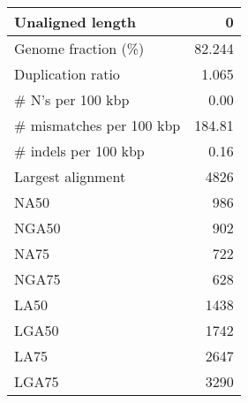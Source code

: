 \documentclass[12pt,a4paper]{article}
\begin{document}
\begin{table}[ht]
\begin{center}
\begin{tabular}{|l*{1}{|r}|}
Unaligned length & 0 \\ \hline
Genome fraction (\%) & 82.244 \\ \hline
Duplication ratio & 1.065 \\ \hline
\# N's per 100 kbp & 0.00 \\ \hline
\# mismatches per 100 kbp & 184.81 \\ \hline
\# indels per 100 kbp & 0.16 \\ \hline
Largest alignment & 4826 \\ \hline
NA50 & 986 \\ \hline
NGA50 & 902 \\ \hline
NA75 & 722 \\ \hline
NGA75 & 628 \\ \hline
LA50 & 1438 \\ \hline
LGA50 & 1742 \\ \hline
LA75 & 2647 \\ \hline
LGA75 & 3290 \\ \hline
\end{tabular}
\end{center}
\end{table}
\end{document}

